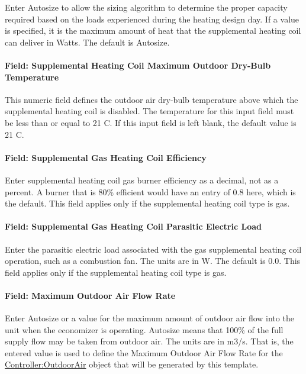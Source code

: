 Enter Autosize to allow the sizing algorithm to determine the proper capacity required based on the loads experienced during the heating design day. If a value is specified, it is the maximum amount of heat that the supplemental heating coil can deliver in Watts. The default is Autosize.

\paragraph{Field: Supplemental Heating Coil Maximum Outdoor Dry-Bulb Temperature}\label{field-supplemental-heating-coil-maximum-outdoor-dry-bulb-temperature-1}

This numeric field defines the outdoor air dry-bulb temperature above which the supplemental heating coil is disabled. The temperature for this input field must be less than or equal to 21 C. If this input field is left blank, the default value is 21 C.

\paragraph{Field: Supplemental Gas Heating Coil Efficiency}\label{field-supplemental-gas-heating-coil-efficiency-1}

Enter supplemental heating coil gas burner efficiency as a decimal, not as a percent. A burner that is 80\% efficient would have an entry of 0.8 here, which is the default. This field applies only if the supplemental heating coil type is gas.

\paragraph{Field: Supplemental Gas Heating Coil Parasitic Electric Load}\label{field-supplemental-gas-heating-coil-parasitic-electric-load-1}

Enter the parasitic electric load associated with the gas supplemental heating coil operation, such as a combustion fan. The units are in W. The default is 0.0. This field applies only if the supplemental heating coil type is gas.

\paragraph{Field: Maximum Outdoor Air Flow Rate}\label{field-maximum-outdoor-air-flow-rate-1}

Enter Autosize or a value for the maximum amount of outdoor air flow into the unit when the economizer is operating. Autosize means that 100\% of the full supply flow may be taken from outdoor air. The units are in m3/s. That is, the entered value is used to define the Maximum Outdoor Air Flow Rate for the \hyperref[controlleroutdoorair]{Controller:OutdoorAir} object that will be generated by this template.

